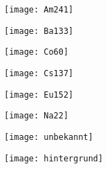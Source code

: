 \documentclass[]{article}
\begin{document}
\begin{figure}
	\centering
	\texttt{[image: Am241]}
	\caption{}
	\label{fig:am241}
\end{figure}
\begin{figure}
	\centering
	\texttt{[image: Ba133]}
	\caption{}
	\label{fig:ba133}
\end{figure}
\begin{figure}
	\centering
	\texttt{[image: Co60]}
	\caption{}
	\label{fig:co60}
\end{figure}
\begin{figure}
	\centering
	\texttt{[image: Cs137]}
	\caption{}
	\label{fig:cs137}
\end{figure}
\begin{figure}
	\centering
	\texttt{[image: Eu152]}
	\caption{}
	\label{fig:eu152}
\end{figure}
\begin{figure}
	\centering
	\texttt{[image: Na22]}
	\caption{}
	\label{fig:na22}
\end{figure}
\begin{figure}
	\centering
	\texttt{[image: unbekannt]}
	\caption{}
	\label{fig:unbekannt}
\end{figure}
\begin{figure}
	\centering
	\texttt{[image: hintergrund]}
	\caption{}
	\label{fig:hintergrund}
\end{figure}
\end{document}
